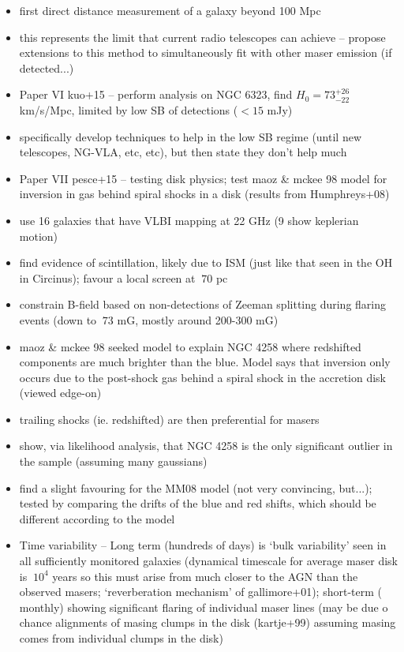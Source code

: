 \begin{itemize}
\item first direct distance measurement of a galaxy beyond 100 Mpc
\item this represents the limit that current radio telescopes can achieve -- propose extensions to this method to simultaneously fit with other maser emission (if detected...)
\item Paper VI kuo+15 -- perform analysis on NGC 6323, find $H_0=73^{+26}_{-22}$ km/s/Mpc, limited by low SB of detections ($\lt 15$ mJy)
\item specifically develop techniques to help in the low SB regime (until new telescopes, NG-VLA, etc, etc), but then state they don't help much
\item Paper VII pesce+15 -- testing disk physics; test maoz & mckee 98 model for inversion in gas behind spiral shocks in a disk (results from Humphreys+08)
\item use 16 galaxies that have VLBI mapping at 22 GHz (9 show keplerian motion) 
\item find evidence of scintillation, likely due to ISM (just like that seen in the OH in Circinus); favour a local screen at $~70$ pc
\item constrain B-field based on non-detections of Zeeman splitting during flaring events (down to $~73$ mG, mostly around 200-300 mG)
\item maoz & mckee 98 seeked model to explain NGC 4258 where redshifted components are much brighter than the blue. Model says that inversion only occurs due to the post-shock gas behind a spiral shock in the accretion disk (viewed edge-on)
\item trailing shocks (ie. redshifted) are then preferential for masers
\item show, via likelihood analysis, that NGC 4258 is the only significant outlier in the sample (assuming many gaussians)
\item find a slight favouring for the MM08 model (not very convincing, but...); tested by comparing the drifts of the blue and red shifts, which should be different according to the model
\item Time variability -- Long term (hundreds of days) is `bulk variability' seen in all sufficiently monitored galaxies (dynamical timescale for average maser disk is $~10^4$ years so this must arise from much closer to the AGN than the observed masers; `reverberation mechanism' of gallimore+01); short-term ($~$monthly) showing significant flaring of individual maser lines (may be due o chance alignments of masing clumps in the disk (kartje+99) assuming masing comes from individual clumps in the disk)

\end{itemize}
